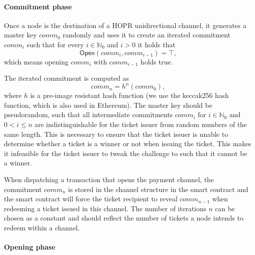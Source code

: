 \paragraph{Commitment phase}

Once a node is the destination of a HOPR unidirectional channel, it generates a master key $comm_0$ randomly and uses it to create an iterated commitment $comm_i$ such that for every $i \in \mathbb{N}_0$ and $i > 0$ it holds that $$ \mathsf{Open}(comm_{i}, comm_{i-1}) = \top,$$ which means opening $comm_{i}$ with $comm_{i-1}$ holds true.

The iterated commitment is computed as $$comm_n = h^n(comm_0),$$ where $h$ is a pre-image resistant hash function (we use the keccak256 hash function, which is also used in Ethereum). The master key should be pseudorandom, such that all intermediate commitments $comm_{i}$ for $i \in \mathbb{N}_0$ and $0 < i \le n$ are indistinguishable for the ticket issuer from random numbers of the same length. This is necessary to ensure that the ticket issuer is unable to determine whether a ticket is a winner or not when issuing the ticket. This makes it infeasible for the ticket issuer to tweak the challenge to such that it cannot be a winner.

When dispatching a transaction that opens the payment channel, the commitment $comm_n$ is stored in the channel structure in the smart contract and the smart contract will force the ticket recipient to reveal $comm_{n-1}$ when redeeming a ticket issued in this channel. The number of iterations $n$ can be chosen as a constant and should reflect the number of tickets a node intends to redeem within a channel.

\paragraph{Opening phase}

